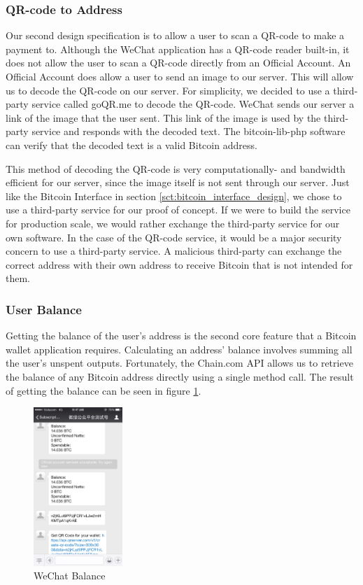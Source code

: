 \subsubsection{QR-code to Address}
Our second design specification is to allow a user to scan a QR-code to make a payment to. Although the WeChat application has a QR-code reader built-in, it does not allow the user to scan a QR-code directly from an Official Account. An Official Account does allow a user to send an image to our server. This will allow us to decode the QR-code on our server. For simplicity, we decided to use a third-party service called goQR.me to decode the QR-code. WeChat sends our server a link of the image that the user sent. This link of the image is used by the third-party service and responds with the decoded text. The bitcoin-lib-php software can verify that the decoded text is a valid Bitcoin address.

This method of decoding the QR-code is very computationally- and bandwidth efficient for our server, since the image itself is not sent through our server. Just like the Bitcoin Interface in section \ref{sct:bitcoin_interface_design}, we chose to use a third-party service for our proof of concept. If we were to build the service for production scale, we would rather exchange the third-party service for our own software. In the case of the QR-code service, it would be a major security concern to use a third-party service. A malicious third-party can exchange the correct address with their own address to receive Bitcoin that is not intended for them.



\subsubsection{User Balance}

Getting the balance of the user's address is the second core feature that a Bitcoin wallet application requires. Calculating an address' balance involves summing all the user's unspent outputs. Fortunately, the Chain.com API allows us to retrieve the balance of any Bitcoin address directly using a single method call. The result of getting the balance can be seen in figure \ref{fig:wechat_balance}.

\begin{figure}
  \centering
    \includegraphics[width=0.3\textwidth]{figs/wechat_balance.jpg}
   \caption{WeChat Balance} 
   \label{fig:wechat_balance}
\end{figure}


